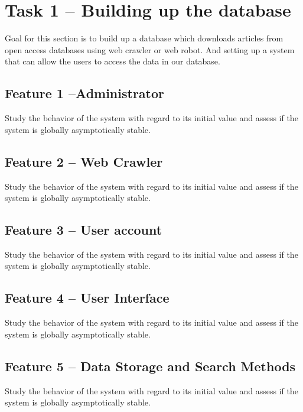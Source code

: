\documentclass[a4paper]{article} %
\begin{document}
\section*{Task 1 -- Building up the database}
\label{task1}

Goal for this section is to build up a database which downloads articles from open access databases using web crawler or web robot. And setting up a system that can allow the users to access the data in our database.

\subsection*{Feature 1 --Administrator}
\label{task1:feature1}

Study the behavior of the system with regard to its initial value and assess if the system is globally asymptotically stable.

\subsection*{Feature 2 -- Web Crawler}
\label{task1:feature2}

Study the behavior of the system with regard to its initial value and assess if the system is globally asymptotically stable.

\subsection*{Feature 3 -- User account}
\label{task1:feature3}

Study the behavior of the system with regard to its initial value and assess if the system is globally asymptotically stable.

\subsection*{Feature 4 -- User Interface}
\label{task1:feature4}

Study the behavior of the system with regard to its initial value and assess if the system is globally asymptotically stable.

\subsection*{Feature 5 -- Data Storage and Search Methods}
\label{task1:feature5}

Study the behavior of the system with regard to its initial value and assess if the system is globally asymptotically stable.
\end{document}
